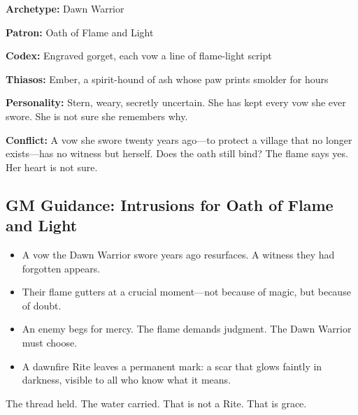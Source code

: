\textbf{Archetype:} Dawn Warrior

\textbf{Patron:} Oath of Flame and Light

\textbf{Codex:} Engraved gorget, each vow a line of flame-light script

\textbf{Thiasos:} Ember, a spirit-hound of ash whose paw prints smolder for hours

\textbf{Personality:} Stern, weary, secretly uncertain. She has kept every vow she ever swore. She is not sure she remembers why.

\textbf{Conflict:} A vow she swore twenty years ago—to protect a village that no longer exists—has no witness but herself. Does the oath still bind? The flame says yes. Her heart is not sure.

\subsection{GM Guidance: Intrusions for Oath of Flame and Light}

\begin{itemize}
\item A vow the Dawn Warrior swore years ago resurfaces. A witness they had forgotten appears.
\item Their flame gutters at a crucial moment—not because of magic, but because of doubt.
\item An enemy begs for mercy. The flame demands judgment. The Dawn Warrior must choose.
\item A dawnfire Rite leaves a permanent mark: a scar that glows faintly in darkness, visible to all who know what it means.
\end{itemize}

The thread held. The water carried. That is not a Rite. That is grace.
